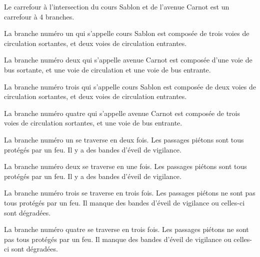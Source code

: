 \begin{appendix}
\label{annexe:q_ID36_carrefour1}

Le carrefour à l'intersection du cours Sablon et de l'avenue Carnot est un carrefour à 4 branches.

\newpar{}


\newpar{}

La branche numéro un qui s'appelle cours Sablon est composée de trois voies de circulation sortantes, et deux voies de circulation entrantes.


\newpar{}

La branche numéro deux qui s'appelle avenue Carnot est composée d'une voie de bus sortante, et une voie de circulation et une voie de bus entrante.


\newpar{}

La branche numéro trois qui s'appelle cours Sablon est composée de deux voies de circulation sortantes, et deux voies de circulation entrantes.

\newpar{}

La branche numéro quatre qui s'appelle avenue Carnot est composée de trois voies de circulation sortantes, et une voie de bus entrante.

\newpar{}

La branche numéro un se traverse en deux fois.  Les passages piétons sont tous protégés par un feu. Il y a des bandes d'éveil de vigilance.

\newpar{}

La branche numéro deux se traverse en une fois. Les passages piétons sont tous protégés par un feu. Il y a des bandes d'éveil de vigilance.

\newpar{}

La branche numéro trois se traverse en trois fois. Les passages piétons ne sont pas tous protégés par un feu. Il manque des bandes d'éveil de vigilance ou celles-ci sont dégradées.

\newpar{}

La branche numéro quatre se traverse en trois fois. Les passages piétons ne sont pas tous protégés par un feu. Il manque des bandes d'éveil de vigilance ou celles-ci sont dégradées.

\newpar{}


\end{appendix}